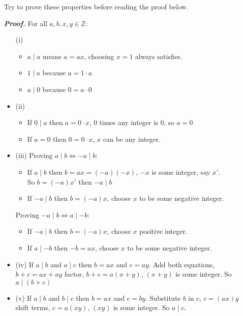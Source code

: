 \noindent
Try to prove these properties before reading the proof below.
\noindent
\begin{Proof}
    \label{proof:properties_of_divisibility}
    \textit{\textbf{Proof.}} For all $a, b, x,y \in \mathbb{Z}$:
    \begin{itemize}
        \item[(i)]  \begin {itemize}
        \item $a\mid a$ means $a = ax$, choosing $x = 1$ always satisfies.
        \item $1\mid a$ because $a = 1\cdot a$
        \item $a\mid 0$ because $0 = a\cdot 0$
    \end{itemize}
    \item[(ii)] \begin {itemize}
    \item If $0\mid a$ then $a = 0\cdot x$, 0 times any integer is 0, so $a = 0$
    \item If $a = 0$ then $0 = 0\cdot x$, $x$ can be any integer.
    \end {itemize}

    \noindent
    \item[(iii)]
    Proving $a\mid b \Longleftrightarrow -a\mid b$:
    \begin{itemize}
        \item If $a\mid b$ then $b = ax = (-a)(-x)$, $-x$ is some integer, say $x'$.\\
              So $b = (-a)x'$ then $-a\mid b$
        \item If $-a\mid b$ then $b = (-a)x$, choose $x$ to be some negative integer.\\
    \end{itemize}
    \vspace{-1em}
    Proving $-a\mid b \Longleftrightarrow a\mid -b$:
    \begin{itemize}
        \item If $-a\mid b$ then $b = (-a)x$, choose $x$ positive integer.
        \item If $a\mid -b$ then $-b = ax$, choose $x$ to be some negative integer.
    \end{itemize}
    \item[(iv)] If $a\mid b$ and $a\mid c$ then $b = ax$ and $c = ay$. Add both equations, $b+c = ax+ay$
    factor, $b+c = a(x+y)$, $(x+y)$ is some integer. So $a\mid (b+c)$

    \item[(v)] If $a\mid b$ and $b\mid c$ then $b = ax$ and $c = by$. Substitute $b$ in $c$, $c = (ax)y$\\
    shift terms, $c = a(xy)$, $(xy)$ is some integer. So $a\mid c$.
    \end{itemize}

\end{Proof}

